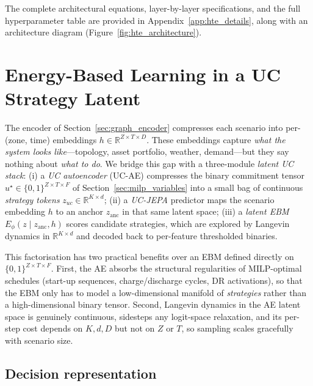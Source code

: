 \documentclass{article}
\begin{document}
The complete architectural equations, layer-by-layer specifications, and the full hyperparameter table are provided in Appendix~\ref{app:hte_details}, along with an architecture diagram (Figure~\ref{fig:hte_architecture}).



\section{Energy-Based Learning in a UC Strategy Latent}
\label{sec:ebm}

The encoder of Section~\ref{sec:graph_encoder} compresses each scenario into per-(zone, time) embeddings $h \in \mathbb{R}^{Z \times T \times D}$. These embeddings capture \emph{what the system looks like}---topology, asset portfolio, weather, demand---but they say nothing about \emph{what to do}. We bridge this gap with a three-module \emph{latent UC stack}: (i) a \emph{UC autoencoder} (UC-AE) compresses the binary commitment tensor $u^\star \in \{0,1\}^{Z \times T \times F}$ of Section~\ref{sec:milp_variables} into a small bag of continuous \emph{strategy tokens} $z_{uc} \in \mathbb{R}^{K \times d}$; (ii) a \emph{UC-JEPA} predictor maps the scenario embedding $h$ to an anchor $z_{\mathrm{anc}}$ in that same latent space; (iii) a \emph{latent EBM} $E_\phi(z \mid z_{\mathrm{anc}}, h)$ scores candidate strategies, which are explored by Langevin dynamics in $\mathbb{R}^{K\times d}$ and decoded back to per-feature thresholded binaries.

This factorisation has two practical benefits over an EBM defined directly on $\{0,1\}^{Z\times T \times F}$. First, the AE absorbs the structural regularities of MILP-optimal schedules (start-up sequences, charge/discharge cycles, DR activations), so that the EBM only has to model a low-dimensional manifold of \emph{strategies} rather than a high-dimensional binary tensor. Second, Langevin dynamics in the AE latent space is genuinely continuous, sidesteps any logit-space relaxation, and its per-step cost depends on $K, d, D$ but not on $Z$ or $T$, so sampling scales gracefully with scenario size.

\subsection{Decision representation}
\label{sec:ebm_features}
\end{document}
